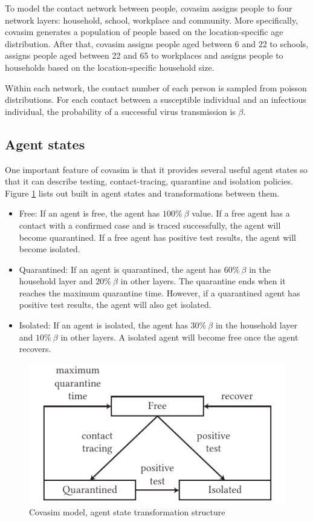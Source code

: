 To model the contact network between people, covasim assigns people to four network layers: household, school, workplace and community. More specifically, covasim generates a population of people based on the location-specific age distribution. After that, covasim assigns people aged between 6 and 22 to schools, assigns people aged between 22 and 65 to workplaces and assigns people to households based on the location-specific household size.

Within each network, the contact number of each person is sampled from poisson distributions. For each contact between a susceptible individual and an infectious individual, the probability of a successful virus transmission is $\beta$.

\subsection{Agent states}

One important feature of covasim is that it provides several useful agent states so that it can describe testing, contact-tracing, quarantine and isolation policies. Figure \ref{state} lists out built in agent states and transformations between them.
\begin{itemize}
	\item Free: If an agent is free, the agent has $100\%~\beta$ value. If a free agent has a contact with a confirmed case and is traced successfully, the agent will become quarantined. If a free agent has positive test results, the agent will become isolated.
	\item Quarantined: If an agent is quarantined, the agent has $60\%~\beta$ in the household layer and $20\%~\beta$ in other layers. The quarantine ends when it reaches the maximum quarantine time. However, if a quarantined agent has positive test results, the agent will also get isolated.
	\item Isolated: If an agent is isolated, the agent has $30\%~\beta$ in the household layer and $10\%~\beta$ in other layers. A isolated agent will become free once the agent recovers.
\end{itemize}

\begin{figure}
	\centering
	\includegraphics{model/state.pdf}
	\caption{Covasim model, agent state transformation structure}
	\label{state}
\end{figure}

